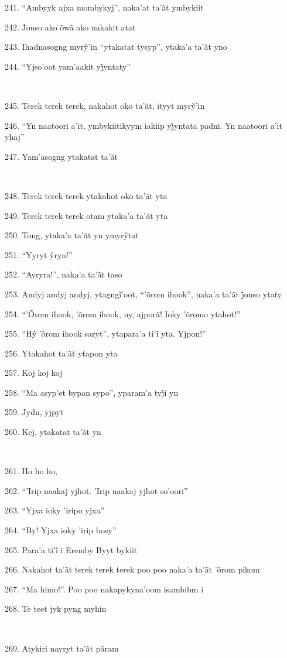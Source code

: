 241. ``Ambyyk ajxa mombykyj'', naka'at ta'ãt ymbykiit

242. J̃onso ako õwã ako nakakit atat

243. Ihadnasogng myrỹ’in “ytakatat tysyp”, ytaka’a ta’ãt yno

244. “Yjso’oot yam’aakit yj̃yntaty”

~

245. Terek terek terek, nakahot oko ta’ãt, ityyt myrỹ’in

246. “Yn naatoori a’it, ymbykiitikyym iakiip yj̃yntata padni. Yn naatoori a’it yhaj”

247. Yam'asogng ytakatat ta'ãt

~

248. Terek terek terek ytakahot oko ta'ãt yta

249. Terek terek terek otam ytaka'a ta'ãt yta

250. Tong, ytaka’a ta’ãt yn ymyrỹtat

251. “Yyryt ỹryn!”

252. ``Ayryra!'', naka'a ta'ãt taso

253. Andyj andyj andyj, ytagngĩ’oot, “’õrom ihook”, naka’a ta’ãt j̃onso ytaty

254. ``'Õrom ihook, 'õrom ihook, ny, ajporã! Ioky 'õromo ytahot!''

255. “Hỹ ’õrom ihook saryt”, ytapara’a ti’ĩ yta. Yjpon!”

256. Ytakahot ta'ãt ytapon yta

257. Koj koj koj

258. “Ma asyp’et bypan sypo”, yparam’a tyj̃i yn

259. Jydn, yjpyt

260. Kej, ytakatat ta'ãt yn

~

261. Ho ho ho,

262. ``'Irip naakaj yjhot. 'Irip naakaj yjhot so'oori''

263. ``Yjxa ioky 'iripo yjxa''

264. ``By! Yjxa ioky 'irip bosy''

265. Para’a ti’ĩ i Eremby Byyt bykiit

266. Nakahot ta'ãt terek terek terek poo poo naka'a ta'ãt 'õrom pikom

267. ``Ma himo!''. Poo poo nakapykyna'oom isambibm i

268. Te teet jyk pyng myhin

~

269. Atykiri nayryt ta'ãt pãram

